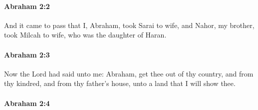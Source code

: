 		\paragraph{Abraham 2:2} %
			\label{ABRAHAM-2-2}

			And it came to pass that I, Abraham, took Sarai to wife, and Nahor, my brother, took Milcah to wife, who was the daughter of Haran.


		\paragraph{Abraham 2:3} %
			\label{ABRAHAM-2-3}

			Now the Lord had said unto me: Abraham, get thee out of thy country, and from thy kindred, and from thy father's house, unto a land that I will show thee.


		\paragraph{Abraham 2:4} %
			\label{ABRAHAM-2-4}

